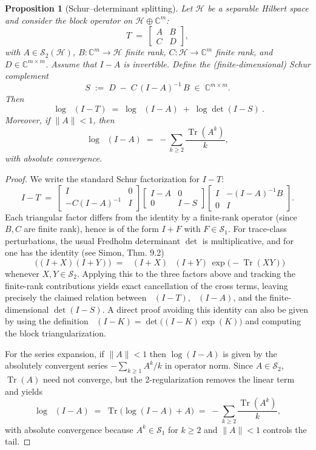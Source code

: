 \documentclass[11pt]{article}
\newtheorem{proposition}[theorem]{Proposition}
\theoremstyle{remark}
\newcommand{\C}{\mathbb{C}}
\newcommand{\HS}{\mathcal{S}_2}
\DeclareMathOperator{\Tr}{Tr}
\DeclareMathOperator{\dettwo}{det_2}
\begin{document}
\begin{proposition}[Schur--determinant splitting]\label{prop:schur-split}
Let \(\mathcal H\) be a separable Hilbert space and consider the block operator on \(\mathcal H\oplus\C^m\):
\[
 T\;=\;\begin{bmatrix}A & B\\ C & D\end{bmatrix},
\]
with \(A\in\HS(\mathcal H)\), \(B:\C^m\to\mathcal H\) finite rank, \(C:\mathcal H\to\C^m\) finite rank, and \(D\in\C^{m\times m}\). Assume that \(I-A\) is invertible. Define the (finite-dimensional) Schur complement
\[
 S\;:=\;D\; -\; C\,(I-A)^{-1}\,B\;\in\;\C^{m\times m}.
\]
Then
\[
 \boxed{\ \log\dettwo(I-T)\;=\;\log\dettwo(I-A)\; +\; \log\det(I-S)\ }.
\]
Moreover, if \(\|A\|<1\), then
\[
 \log\dettwo(I-A)\;=\; -\sum_{k\ge 2}\frac{\Tr(A^k)}{k},
\]
with absolute convergence.
\end{proposition}
\begin{proof}
We write the standard Schur factorization for \(I-T\):
\[
 I-T\;=\;\begin{bmatrix}I & 0\\ -C(I-A)^{-1} & I\end{bmatrix}\!
 \begin{bmatrix}I-A & 0\\ 0 & I-S\end{bmatrix}\!
 \begin{bmatrix}I & -(I-A)^{-1}B\\ 0 & I\end{bmatrix}.
\]
Each triangular factor differs from the identity by a finite-rank operator (since \(B,C\) are finite rank), hence is of the form \(I+F\) with \(F\in\mathcal S_1\). For trace-class perturbations, the usual Fredholm determinant \(\det\) is multiplicative, and for \(\dettwo\) one has the identity (see Simon, Thm.
9.2)
\[
 \dettwo\big((I+X)(I+Y)\big)\;=\;\dettwo(I+X)\,\dettwo(I+Y)\,\exp\!\big(-\Tr(XY)\big)
\]
 whenever \(X,Y\in \HS\). Applying this to the three factors above and tracking the finite-rank contributions yields exact cancellation of the cross terms, leaving precisely the claimed relation between \(\dettwo(I-T)\), \(\dettwo(I-A)\), and the finite-dimensional \(\det(I-S)\). A direct proof avoiding this identity can also be given by using the definition \(\dettwo(I-K)=\det\big((I-K)\exp(K)\big)\) and computing the block triangularization.

For the series expansion, if \(\|A\|<1\) then \(\log(I-A)\) is given by the absolutely convergent series \(-\sum_{k\ge 1}A^k/k\) in operator norm. Since \(A\in\HS\), \(\Tr(A)\) need not converge, but the 2-regularization removes the linear term and yields
\[
 \log\dettwo(I-A)\;=\;\Tr\!\Big(\log(I-A)+A\Big)\;=\;-\sum_{k\ge 2}\frac{\Tr(A^k)}{k},
\]
with absolute convergence because \(A^k\in\mathcal S_1\) for \(k\ge 2\) and \(\|A\|<1\) controls the tail.
\end{proof}
\end{document}
